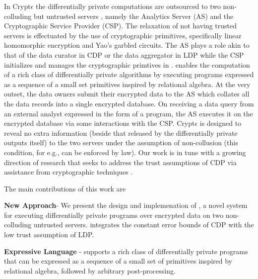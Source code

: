 In Crypt$\epsilon$ the differentially private computations are outsourced to two non-colluding but untrusted servers \cite{Boneh1,Boneh2,Ridge2,Matrix2,secureML,LReg,Ver}, namely the Analytics Server (\textsf{AS}) and the Cryptographic Service Provider (\textsf{CSP}). The relaxation of not having trusted servers is effectuated by the use of cryptographic primitives, specifically linear homomorphic encryption and Yao's garbled circuits. The \textsf{AS} plays a role akin to that of the data curator in \textsf{CDP} or the data aggregator in \textsf{LDP} while the \textsf{CSP} initializes and manages the cryptographic primtives in \system. \system enables the computation of a rich class of differentially private algorithms by executing programs expressed as a sequence of a small set \system primitives inspired by relational algebra. At the very outset, the data owners submit their encrypted data to the \textsf{AS} which collates all the data records into a single encrypted database.  On receiving a data query from an external analyst expressed in the form of a \system program, the \textsf{AS} executes it on the encrypted database via some interactions with the \textsf{CSP}.  Crypt$\epsilon$ is designed to reveal no extra information (beside that released by the differentially private outputs itself) to
the two servers under the assumption of  non-collusion (this condition, for e.g., can be enforced by law).  Our work is in tune with a growing direction of research that seeks to address the trust assumptions of \textsf{CDP} via assistance from cryptographic techniques \cite{Prochlo,mixnets,amplification,Shi,Shi2,kamara,Rastogi}.
\par The main contributions of this work are
\squishlist
	\item \textbf{New Approach}- We present the design and implemenation of \system, a novel system for executing differentially private programs over encrypted data on two non-colluding untrusted servers. \system integrates the constant error bounds of \textsf{CDP} with the low trust assumption of \textsf{LDP}.
	\item \textbf{Expressive Language} - \system supports a rich class of differentially private programs that can be expressed as a sequence of a small set of \system primitives inspired by relational algebra, followed by arbitrary post-processing. %
